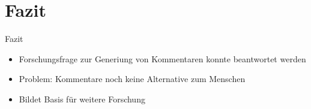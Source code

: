\section{Fazit}

\begin{frame}{Fazit}
\begin{itemize}
	\item Forschungsfrage zur Generiung von Kommentaren konnte beantwortet werden
	\item Problem: Kommentare noch keine Alternative zum Menschen
	\item Bildet Basis für weitere Forschung
\end{itemize}
\end{frame}
